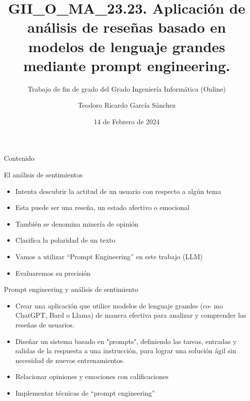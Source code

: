 \documentclass[aspectratio=169,xcolor=dvipsnames, t]{beamer}
\title[Prompt sentiment]{GII\_O\_MA\_23.23. Aplicación de análisis de reseñas basado en modelos de lenguaje grandes mediante prompt engineering.} %
\subtitle{Trabajo de fin de grado del Grado Ingeniería Informática (Online)}
\author[García Sánchez]{Teodoro Ricardo García Sánchez}
\institute[Grado de Ingeniería Informática (Online)]{Grado de Ingeniería Informática (Online)\newline Escuela Politécnica Superior\newline Universidad de Burgos}
\date{14 de Febrero de 2024} %
\begin{document}
\maketitlepage

\begin{frame}[t]{Contenido}
    \tableofcontents
\end{frame}


\begin{frame}{El análisis de sentimientos}
    \begin{itemize}
        \item Intenta descubrir la actitud de un usuario con respecto a algún tema
        \item Esta puede ser una reseña, un estado afectivo o emocional
        \item También se denomina minería de opinión
        \item Clasifica la polaridad de un texto
        \item Vamos a utilizar ``Prompt Engineering'' en este trabajo (LLM)
        \item Evaluaremos su precisión
    \end{itemize}
\end{frame}


\begin{frame}{Prompt engineering y análisis de sentimiento}
    \begin{itemize}
        \item Crear una aplicación que utilice modelos de lenguaje grandes (co- mo ChatGPT, Bard o Llama) de manera efectiva para analizar y comprender las reseñas de usuarios.
        \item Diseñar un sistema basado en "prompts", definiendo las tareas, entradas y salidas de la respuesta a una instrucción, para lograr una solución ágil sin necesidad de nuevos entrenamientos.
        \item Relacionar opiniones y emociones con calificaciones
        \item Implementar técnicas de “prompt engineering”
        
    \end{itemize}
\end{frame}
\end{document}
